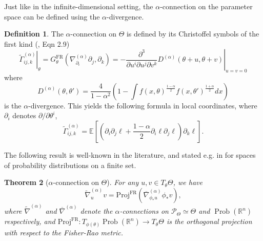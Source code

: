 \documentclass[11pt]{amsart}
\newtheorem{theorem}{Theorem}[section]
\theoremstyle{definition}
\newtheorem{definition}[theorem]{Definition}
\newcommand{\R}{\mathbb R}
\newcommand{\E}{\mathbb E}
\newcommand{\ProbRn}{\operatorname{Prob}(\R^n)}
\newcommand{\GFR}{G^{\mathrm{FR}}}
\newcommand{\nablabar}{\overline{\nabla}}
\newcommand{\nablatilde}{\tilde{\nabla}}
\begin{document}
Just like in the infinite-dimensional setting, the $\alpha$-connection on the parameter space can be defined using the $\alpha$-divergence.
\begin{definition}
The $\alpha$-connection on $\Theta$ is defined by its Christoffel symbols of the first kind (\cite{zhang2004divergence}, Eqn 2.9)
$$\left.\tilde\Gamma^{(\alpha)}_{ij,k}\right|_\theta=\GFR_\theta(\nabla^{(\alpha)}_{\partial_i}{\partial_j},\partial_k)=\left.-\frac{\partial^3}{\partial u^i \partial u^j \partial v^k}D^{(\alpha)}(\theta+u , \theta + v)\right|_{u=v=0}$$
where
$$D^{(\alpha)}(\theta, \theta')=\frac{4}{1-\alpha^2}\left(1 - \int f(x,\theta)^{\frac{1-\alpha}{2}}f(x,\theta')^{\frac{1+\alpha}{2}} dx\right)$$
is the $\alpha$-divergence. This yields the following formula in local coordinates, where $\partial_i$ denotes $\partial/\partial\theta^i$,
\begin{equation}\label{alpha-finite}
\tilde\Gamma_{ij,k}^{(\alpha)}=\E\left[(\partial_i\partial_j\ell + \frac{1-\alpha}{2} \partial_i\ell \partial_j\ell )\partial_k\ell\right].
\end{equation}
\end{definition}
The following result is well-known in the literature, and stated e.g. in \cite{amari2000methods} for spaces of probability distributions on a finite set.
\begin{theorem}[$\alpha$-connection on $\Theta$]\label{thm:finite-alpha}
For any $u,v\in T_\theta\Theta$, we have
$$\nablatilde^{(\alpha)}_uv = \mathrm{Proj}^{\mathrm{FR}}\left(\nablabar^{(\alpha)}_{\phi_*u}\phi_*v\right),$$
where $\nablatilde^{(\alpha)}$ and $\nablabar^{(\alpha)}$ denote the $\alpha$-connections on $\mathcal P_\Theta \simeq\Theta$ and $\ProbRn$ respectively, and $\mathrm{Proj}^{\mathrm{FR}}:T_{\phi(\theta)}\ProbRn\rightarrow T_\theta\Theta$ is the orthogonal projection with respect to the Fisher-Rao metric.
\end{theorem}
\end{document}
